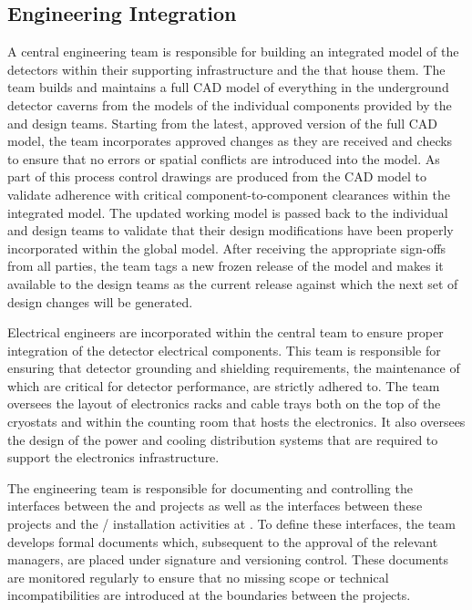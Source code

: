 \subsection{Engineering Integration}
\label{sec:dune_engineering}

A central  engineering team is responsible for building 
an integrated model of the detectors within their supporting
infrastructure and the  that house them.  The team
builds and maintains a full \threed CAD model of everything in the
underground detector caverns from the models of the individual
components provided by the  and  design 
teams.  Starting from the latest, approved version of the full CAD 
model, the  team incorporates approved changes as they 
are received and checks to ensure that no errors or spatial conflicts 
are introduced into the model.  As part of this process \twod control 
drawings are produced from the \threed CAD model to validate adherence 
with critical component-to-component clearances within the integrated
model.  The updated working model is passed back to the individual
 and  design teams to validate that their
design modifications have been properly incorporated within the 
global model.  After receiving the appropriate sign-offs from all 
parties, the  team tags a new frozen release of the model 
and makes it available to the design teams as the current release 
against which the next set of design changes will be generated.

Electrical engineers are incorporated within the central  
team to ensure proper integration of the detector electrical 
components.  This team is responsible for ensuring that detector 
grounding and shielding requirements, the maintenance of which are 
critical for detector performance, are strictly adhered to.  The 
team oversees the layout of electronics racks and cable trays both 
on the top of the cryostats and within the  counting room 
that hosts the  electronics.  It also oversees the design 
of the power and cooling distribution systems that are required to 
support the electronics infrastructure.

The  engineering team is responsible for documenting and
controlling the interfaces between the  and  
projects as well as the interfaces between these projects and the 
/  installation activities at .  
To define these interfaces, the  team develops formal 
documents which, subsequent to the approval of the relevant managers, 
are placed under signature and versioning control.  These documents 
are monitored regularly to ensure that no missing scope or technical 
incompatibilities are introduced at the boundaries between the projects.

